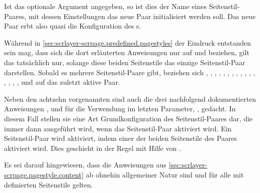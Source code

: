 Ist das optionale Argument  angegeben, so ist dies der Name
eines Seitenstil-Paares, mit dessen Einstellungen das neue Paar initialisiert
werden soll. Das neue Paar erbt also quasi die Konfiguration des
s.

{\setlength{\emergencystretch}{1em}%
Während in \autoref{sec:scrlayer-scrpage.predefined.pagestyles} der Eindruck
entstanden sein mag, dass sich die dort erläuterten Anweisungen nur auf
 und  beziehen, gilt das
tatsächlich nur, solange diese beiden Seitenstile das einzige Seitenstil-Paar
darstellen. Sobald es mehrere Seitenstil-Paare gibt, beziehen sich 
, ,
, ,
, ,
, ,
, ,
, ,
, ,
, ,
 und 
auf das zuletzt aktive Paar.\par}

{\setlength{\emergencystretch}{1em}%
  Neben den achtzehn vorgenannten sind auch die drei nachfolgend
  dokumentierten Anweisungen
  ,
   und
   für die
  Verwendung im letzten Parameter, , gedacht. In diesem Fall
  stellen sie eine Art Grundkonfiguration des Seitenstil-Paares dar, die immer
  dann ausgeführt wird, wenn das Seitenstil-Paar aktiviert wird. Ein
  Seitenstil-Paar wird aktiviert, indem einer der beiden Seitenstile des
  Paares aktiviert wird. Dies geschieht in der Regel mit Hilfe von
  .\par}

Es sei darauf hingewiesen, dass die Anweisungen aus
\autoref{sec:scrlayer-scrpage.pagestyle.content} ab
 ohnehin allgemeiner Natur
sind und für alle mit  definierten Seitenstile
gelten.

